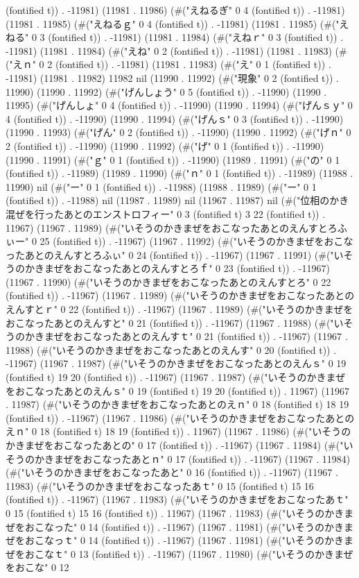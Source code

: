 (fontified t)) . -11981) (11981 . 11986) (#("えねるぎ" 0 4 (fontified t)) . -11981) (11981 . 11985) (#("えねるｇ" 0 4 (fontified t)) . -11981) (11981 . 11985) (#("えねる" 0 3 (fontified t)) . -11981) (11981 . 11984) (#("えねｒ" 0 3 (fontified t)) . -11981) (11981 . 11984) (#("えね" 0 2 (fontified t)) . -11981) (11981 . 11983) (#("えｎ" 0 2 (fontified t)) . -11981) (11981 . 11983) (#("え" 0 1 (fontified t)) . -11981) (11981 . 11982) 11982 nil (11990 . 11992) (#("現象" 0 2 (fontified t)) . 11990) (11990 . 11992) (#("げんしょう" 0 5 (fontified t)) . -11990) (11990 . 11995) (#("げんしょ" 0 4 (fontified t)) . -11990) (11990 . 11994) (#("げんｓｙ" 0 4 (fontified t)) . -11990) (11990 . 11994) (#("げんｓ" 0 3 (fontified t)) . -11990) (11990 . 11993) (#("げん" 0 2 (fontified t)) . -11990) (11990 . 11992) (#("げｎ" 0 2 (fontified t)) . -11990) (11990 . 11992) (#("げ" 0 1 (fontified t)) . -11990) (11990 . 11991) (#("ｇ" 0 1 (fontified t)) . -11990) (11989 . 11991) (#("の" 0 1 (fontified t)) . -11989) (11989 . 11990) (#("ｎ" 0 1 (fontified t)) . -11989) (11988 . 11990) nil (#("ー" 0 1 (fontified t)) . -11988) (11988 . 11989) (#("ー" 0 1 (fontified t)) . -11988) nil (11987 . 11989) nil (11967 . 11987) nil (#("位相のかき混ぜを行ったあとのエンストロフィー" 0 3 (fontified t) 3 22 (fontified t)) . 11967) (11967 . 11989) (#("いそうのかきまぜをおこなったあとのえんすとろふぃー" 0 25 (fontified t)) . -11967) (11967 . 11992) (#("いそうのかきまぜをおこなったあとのえんすとろふぃ" 0 24 (fontified t)) . -11967) (11967 . 11991) (#("いそうのかきまぜをおこなったあとのえんすとろｆ" 0 23 (fontified t)) . -11967) (11967 . 11990) (#("いそうのかきまぜをおこなったあとのえんすとろ" 0 22 (fontified t)) . -11967) (11967 . 11989) (#("いそうのかきまぜをおこなったあとのえんすとｒ" 0 22 (fontified t)) . -11967) (11967 . 11989) (#("いそうのかきまぜをおこなったあとのえんすと" 0 21 (fontified t)) . -11967) (11967 . 11988) (#("いそうのかきまぜをおこなったあとのえんすｔ" 0 21 (fontified t)) . -11967) (11967 . 11988) (#("いそうのかきまぜをおこなったあとのえんす" 0 20 (fontified t)) . -11967) (11967 . 11987) (#("いそうのかきまぜをおこなったあとのえんｓ" 0 19 (fontified t) 19 20 (fontified t)) . -11967) (11967 . 11987) (#("いそうのかきまぜをおこなったあとのえんｓ" 0 19 (fontified t) 19 20 (fontified t)) . 11967) (11967 . 11987) (#("いそうのかきまぜをおこなったあとのえｎ" 0 18 (fontified t) 18 19 (fontified t)) . -11967) (11967 . 11986) (#("いそうのかきまぜをおこなったあとのえｎ" 0 18 (fontified t) 18 19 (fontified t)) . 11967) (11967 . 11986) (#("いそうのかきまぜをおこなったあとの" 0 17 (fontified t)) . -11967) (11967 . 11984) (#("いそうのかきまぜをおこなったあとｎ" 0 17 (fontified t)) . -11967) (11967 . 11984) (#("いそうのかきまぜをおこなったあと" 0 16 (fontified t)) . -11967) (11967 . 11983) (#("いそうのかきまぜをおこなったあｔ" 0 15 (fontified t) 15 16 (fontified t)) . -11967) (11967 . 11983) (#("いそうのかきまぜをおこなったあｔ" 0 15 (fontified t) 15 16 (fontified t)) . 11967) (11967 . 11983) (#("いそうのかきまぜをおこなった" 0 14 (fontified t)) . -11967) (11967 . 11981) (#("いそうのかきまぜをおこなっｔ" 0 14 (fontified t)) . -11967) (11967 . 11981) (#("いそうのかきまぜをおこなｔ" 0 13 (fontified t)) . -11967) (11967 . 11980) (#("いそうのかきまぜをおこな" 0 12 